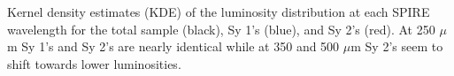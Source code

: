 Kernel density estimates (KDE) of the luminosity distribution at each SPIRE wavelength for the total sample (black), Sy 1's (blue), and Sy 2's (red). At 250 $\mu$m Sy 1's and Sy 2's are nearly identical while at 350 and 500 $\mu$m Sy 2's seem to shift towards lower luminosities.